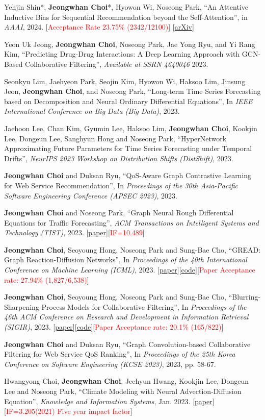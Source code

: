 \documentclass[10pt]{article}
\newenvironment{changemargin}[2]{
  \begin{list}{}{
    \setlength{\topsep}{0pt}
    \setlength{\leftmargin}{#1}
    \setlength{\rightmargin}{#2}
    \setlength{\listparindent}{\parindent}
    \setlength{\itemindent}{\parindent}
    \setlength{\parsep}{\parskip}
  }
  \item[]}{\end{list}
}
\newcommand{\presentation}[2]{
	{#1} \hfill \emph{#2}\\ \bigskip
}
\newcommand{\RED}[1]{\textcolor{red}{#1}}
\newenvironment{body} {
	\vspace*{-16pt}
	\begin{changemargin}{-0.25in}{-0.5in}
  }
	{\end{changemargin}
}
\begin{document}
\begin{body}
\presentation{
 Yehjin Shin*, \textbf{Jeongwhan Choi}*, Hyowon Wi, Noseong Park, ``An Attentive Inductive Bias for Sequential Recommendation beyond the Self-Attention'',  in \textit{AAAI}, 2024. [\RED{Acceptance Rate 23.75\% (2342/12100)}] [\href{https://arxiv.org/abs/2312.10325}{arXiv}]}{}

\presentation{
Yeon Uk Jeong, \textbf{Jeongwhan Choi}, Noseong Park, Jae Yong Ryu, and Yi Rang Kim, ``Predicting Drug-Drug Interactions: A Deep Learning Approach with GCN-Based Collaborative Filtering'', \textit{Available at SSRN 4640046} 2023.}{}

\presentation{
 Seonkyu Lim, Jaehyeon Park, Seojin Kim, Hyowon Wi, Haksoo Lim, Jinsung Jeon, \textbf{Jeongwhan Choi}, and Noseong Park, ``Long-term Time Series Forecasting based on Decomposition and Neural Ordinary Differential Equations'', In \emph{IEEE International Conference on Big Data (Big Data)}, 2023.}{}

\presentation{
Jaehoon Lee, Chan Kim, Gyumin Lee, Haksoo Lim, \textbf{Jeongwhan Choi}, Kookjin Lee, Dongeun Lee, Sanghyun Hong and Noseong Park, ``HyperNetwork Approximating Future Parameters for Time Series Forecasting under Temporal Drifts'', \emph{NeurIPS 2023 Workshop on Distribution Shifts (DistShift)}, 2023.}{}

\presentation{
\textbf{Jeongwhan Choi} and Duksan Ryu, ``QoS-Aware Graph Contrastive Learning for Web Service Recommendation'', In \emph{Proceedings of the 30th Asia-Pacific Software Engineering Conference (APSEC 2023)}, 2023.}{}
\presentation{
\textbf{Jeongwhan Choi} and Noseong Park, ``Graph Neural Rough Differential Equations for Traffic Forecasting'', \emph{ACM Transactions on Intelligent Systems and Technology (TIST)}, 2023. [\href{https://dl.acm.org/doi/abs/10.1145/3604808}{paper}][\RED{IF=10.489}]}{}
\presentation{
\textbf{Jeongwhan Choi}, Seoyoung Hong, Noseong Park and Sung-Bae Cho, ``GREAD: Graph Reaction-Diffusion Networks'', In \emph{Proceedings of the 40th International Conference on Machine Learning (ICML)}, 2023. [\href{http://proceedings.mlr.press/v202/choi23a}{paper}][\href{https://github.com/jeongwhanchoi/GREAD}{code}][\RED{Paper Acceptance rate: 27.94\% (1,827/6,538)}]}{}
\presentation{
\textbf{Jeongwhan Choi}, Seoyoung Hong, Noseong Park and Sung-Bae Cho, ``Blurring-Sharpening Process Models for Collaborative Filtering'', In \emph{Proceedings of the 46th ACM Conference on Research and Development in Information Retrieval (SIGIR)}, 2023. [\href{https://arxiv.org/abs/2211.09324}{paper}][\href{https://github.com/jeongwhanchoi/bspm}{code}][\RED{Paper Acceptance rate: 20.1\% (165/822)}]}{}
\presentation{
\textbf{Jeongwhan Choi} and Duksan Ryu, ``Graph Convolution-based Collaborative Filtering for Web Service QoS Ranking'', In \emph{Proceedings of the 25th Korea Conference on Software Engineering (KCSE 2023)}, 2023, pp. 58-67.}{}
\presentation{
Hwangyong Choi, \textbf{Jeongwhan Choi}, Jeehyun Hwang, Kookjin Lee, Dongeun Lee and Noseong Park, ``Climate Modeling with Neural Advection-Diffusion Equation'', \emph{Knowledge and Information Systems}, Jan. 2023. [\href{https://doi.org/10.1007/s10115-023-01829-2}{paper}] [\RED{IF=3.205(2021) Five year impact factor}]}{}


\end{body}
\end{document}
